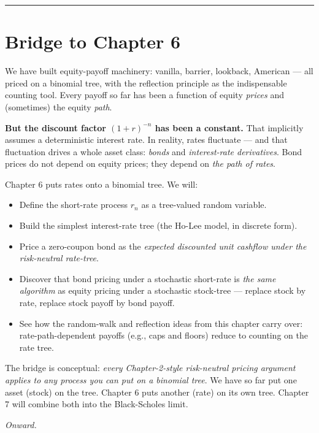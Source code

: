 \documentclass[
  10pt,
  twoside]{book}
\providecommand{\tightlist}{%
  \setlength{\itemsep}{0pt}\setlength{\parskip}{0pt}}
\begin{document}
\begin{center}\rule{0.5\linewidth}{0.5pt}\end{center}

\section{Bridge to Chapter 6}\label{bridge-to-chapter-6}

We have built equity-payoff machinery: vanilla, barrier, lookback,
American --- all priced on a binomial tree, with the reflection
principle as the indispensable counting tool. Every payoff so far has
been a function of equity \emph{prices} and (sometimes) the equity
\emph{path}.

\textbf{But the discount factor \((1+r)^{-n}\) has been a constant.}
That implicitly assumes a deterministic interest rate. In reality, rates
fluctuate --- and that fluctuation drives a whole asset class:
\emph{bonds} and \emph{interest-rate derivatives}. Bond prices do not
depend on equity prices; they depend on \emph{the path of rates}.

Chapter 6 puts rates onto a binomial tree. We will:

\begin{itemize}
\tightlist
\item
  Define the short-rate process \(r_n\) as a tree-valued random
  variable.
\item
  Build the simplest interest-rate tree (the Ho-Lee model, in discrete
  form).
\item
  Price a zero-coupon bond as the \emph{expected discounted unit
  cashflow under the risk-neutral rate-tree}.
\item
  Discover that bond pricing under a stochastic short-rate is \emph{the
  same algorithm} as equity pricing under a stochastic stock-tree ---
  replace stock by rate, replace stock payoff by bond payoff.
\item
  See how the random-walk and reflection ideas from this chapter carry
  over: rate-path-dependent payoffs (e.g., caps and floors) reduce to
  counting on the rate tree.
\end{itemize}

The bridge is conceptual: \emph{every Chapter-2-style risk-neutral
pricing argument applies to any process you can put on a binomial tree}.
We have so far put one asset (stock) on the tree. Chapter 6 puts another
(rate) on its own tree. Chapter 7 will combine both into the
Black-Scholes limit.

\emph{Onward.}
\end{document}
